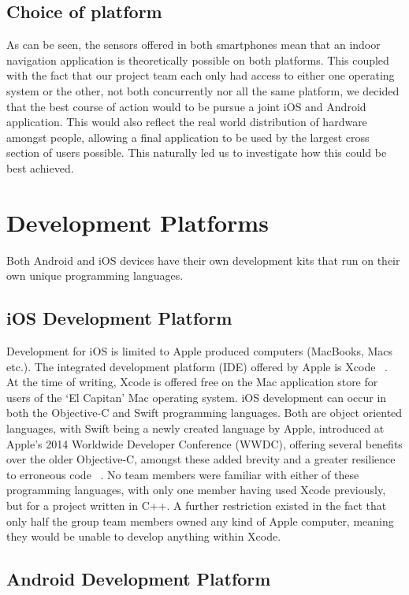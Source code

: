 \documentclass[12pt,a4paper]{report}
\begin{document}
\subsection{Choice of platform}

As can be seen, the sensors offered in both smartphones mean that an indoor navigation application is theoretically possible on both platforms. This coupled with the fact that our project team each only had access to either one operating system or the other, not both concurrently nor all the same platform, we decided that the best course of action would to be pursue a joint iOS and Android application. This would also reflect the real world distribution of hardware amongst people, allowing a final application to be used by the largest cross section of users possible. This naturally led us to investigate how this could be best achieved.

\section{Development Platforms}

Both Android and iOS devices have their own development kits that run on their own unique programming languages.

\subsection{iOS Development Platform}

Development for iOS is limited to Apple produced computers (MacBooks, Macs etc.). The integrated development platform (IDE) offered by Apple is Xcode ~\cite{xcode}. At the time of writing, Xcode is offered free on the Mac application store for users of the `El Capitan' Mac operating system. iOS development can occur in both the Objective-C and Swift programming languages. Both are object oriented languages, with Swift being a newly created language by Apple, introduced at Apple's 2014 Worldwide Developer Conference (WWDC), offering several benefits over the older Objective-C, amongst these added brevity and a greater resilience to erroneous code ~\cite{swift}. No team members were familiar with either of these programming languages, with only one member having used Xcode previously, but for a project written in C++. A further restriction existed in the fact that only half the group team members owned any kind of Apple computer, meaning they would be unable to develop anything within Xcode.

\subsection{Android Development Platform}
\end{document}
